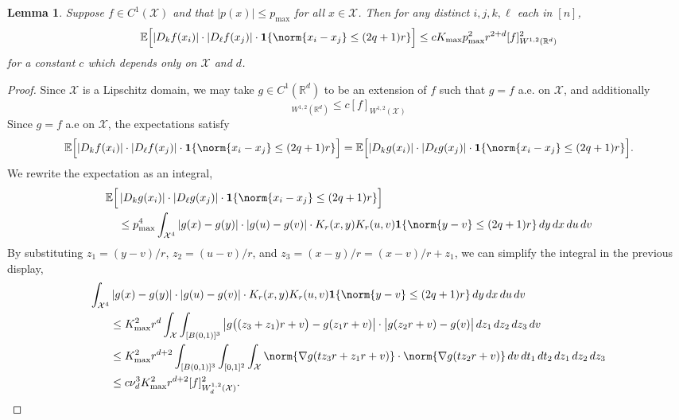 \documentclass{article}
\newcommand{\Reals}{\mathbb{R}}
\newcommand{\abs}[1]{\left \lvert #1 \right \rvert}
\newcommand{\1}{\mathbf{1}}
\newcommand{\Rd}{\Reals^d}
\newcommand{\Xset}{\mathcal{X}}
\newcommand{\Ebb}{\mathbb{E}}
\theoremstyle{alden}
\theoremstyle{aldenthm}
\newtheorem{lemma}{Lemma}
\theoremstyle{definition}
\theoremstyle{remark}
\begin{document}
\begin{lemma}
	\label{lem:expected_first_order_seminorm_3}
	Suppose $f \in C^{1}(\Xset)$ and that $\abs{p(x)} \leq p_{\max}$ for all $x \in \Xset$. Then for any distinct $i,j,k,\ell$ each in $[n]$,
	\begin{equation*}
	\Ebb\Bigl[\abs{D_{k}f(x_i)}\cdot{\abs{D_{\ell}f(x_j)}}\cdot\1\{\norm{x_i - x_j} \leq (2q + 1)r\}\Bigr] \leq c K_{\max} p_{\max}^2 r^{2 + d} [f]_{W^{1,2}(\Rd)}^2
	\end{equation*}
	for a constant $c$ which depends only on $\Xset$ and $d$.
\end{lemma}
\begin{proof}
	Since $\Xset$ is a Lipschitz domain, we may take $g \in C^1(\Rd)$ to be an extension of $f$ such that $g = f$ a.e. on $\Xset$, and additionally
	\begin{equation*}
	[g]_{W^{1,2}(\Rd)} \leq c[f]_{W^{1,2}(\Xset)}
	\end{equation*}
	Since $g = f$ a.e on $\Xset$, the expectations satisfy
	\begin{equation*}
	\Ebb\Bigl[\abs{D_{k}f(x_i)}\cdot{\abs{D_{\ell}f(x_j)}}\cdot\1\{\norm{x_i - x_j} \leq (2q + 1)r\}\Bigr] = 	\Ebb\Bigl[\abs{D_{k}g(x_i)}\cdot{\abs{D_{\ell}g(x_j)}}\cdot\1\{\norm{x_i - x_j} \leq (2q + 1)r\}\Bigr].
	\end{equation*}
	We rewrite the expectation as an integral,
	\begin{align*}
	\Ebb\Bigl[& \abs{D_{k}g(x_i)}\cdot{\abs{D_{\ell}g(x_j)}}\cdot\1\{\norm{x_i - x_j} \leq (2q + 1)r\}\Bigr] \\
	& \leq p_{\max}^4 \int_{\Xset^4} \abs{g(x) - g(y)} \cdot \abs{g(u) - g(v)} \cdot  K_r(x,y) K_r(u,v) \1\{\norm{y - v} \leq (2q + 1)r\} \,dy \,dx \,du \,dv
	\end{align*}
	By substituting $z_1 = (y - v)/r$, $z_2 = (u - v)/r$, and $z_3 = (x - y)/r = (x - v)/r + z_1$, we can simplify the integral in the previous display,
	\begin{align*}
	\int_{\Xset^4} & \abs{g(x) - g(y)} \cdot \abs{g(u) - g(v)} \cdot K_r(x,y) K_r(u,v) \1\{\norm{y - v} \leq (2q + 1)r\} \,dy \,dx \,du \,dv \\
	& \leq K_{\max}^2 r^d \int_{\Xset} \int_{[B(0,1)]^3} \abs{g\bigl((z_3 + z_1)r + v\bigr) - g(z_1r + v)} \cdot \bigl|g(z_2r + v) - g(v)\bigr| \,dz_1 \,dz_2 \,dz_3 \,dv \\
	& \leq  K_{\max}^2 r^{d + 2} \int_{[B(0,1)]^3} \int_{[0,1]^2} \int_{\Xset} \norm{\nabla g(t z_3 r + z_1r + v)} \cdot \norm{\nabla g(t z_2 r + v)} \,dv \,dt_1 \,dt_2 \,dz_1 \,dz_2 \,dz_3 \\
	& \leq c \nu_d^3 K_{\max}^2 r^{d + 2} [f]_{W_{d}^{1,2}(\Xset)}^2.
	\end{align*}
\end{proof}
\end{document}
